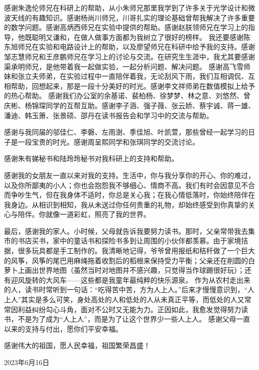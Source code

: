 \begin{acknowledgements}
感谢朱逸伦师兄在科研上的帮助，从小朱师兄那里我学到了许多关于光学设计和微波天线的有趣知识。感谢杨尚川师兄，川哥扎实的理论基础曾帮我解决了许多重要的数学问题。感谢高炳西师兄在实验中提供的帮助。感谢赵朕领师兄在学习上的指导，他既聪明又谦和，在做人做事方面都为我树立了很好的榜样。
我还要感谢陈东旭师兄在实验和电路设计上的帮助，以及廖望师兄在科研中给予我的支持。感谢邹志慧师兄和王彦鹏师兄在学习上的讨论与交流。在研究生生涯中，我尤其要感谢渠承明师兄，是他带着我一起做实验，一起分析问题、解决问题。
感谢高飞雪师妹和张立夫师弟，在实验过程中一直陪伴着我，无论刮风下雨，我们互相调侃、互相帮助，回想起来，那是一段十分美好的时光。感谢李文祥师弟在数值模拟上给予的热心帮助。
感谢我们办公室的余基诺、裴柏杨、徐梦梦、林之意、刘悠然、曾庆彬、杨锦琛同学的互帮互助。感谢李子涵、强子薇、张云娇、蔡宇诚、蒋一雄、潘迪、韩玉箫、张景硕、邵丹在读书报告会和学习中的交流与帮助。

感谢与我同届的邬佳仁、李磐、左雨澍、季佳旭、叶凯萱，那些曾经一起学习的日子是一段宝贵的时光。感谢周呈熙同学和张琪同学的交流讨论。

感谢朱有娣秘书和陆玲玲秘书对我科研上的支持和帮助。


感谢我的女朋友一直以来对我的支持。生活中，你与我分享你的开心、你的难过，以及你所鄙夷的小人；你也会抱怨我不够细心、情商不高。我们有时会因意见不合而争吵生气，但在我身体不适时，你总是关心我；在我心情低落时，你始终陪伴在我身边。从相识到相知，我从未送过你任何贵重的礼物，却始终感受到你真挚的关心与陪伴。你就像一道彩虹，照亮了我的世界。

最后，感谢我的家人。小时候，父母就告诉我要努力读书。那时，父亲常带我去集市的书店买书，家中的童话书和探险书多到让周围的小伙伴都羡慕。由于家境拮据，很多玩具都是手工制作的。我清晰地记得，爷爷曾用报纸和秸秆做了一个巨大的风筝，风筝的尾巴用麻绳拖着收割后的稻根来保持受力平衡；父亲还在削圆的白萝卜上画出世界地图（虽然当时对地图并不感兴趣，只觉得当作球踢很好玩）；还有迎风旋转的大风车——这些都是我童年最纯粹的快乐源泉。
作为从农村走出来的人，读书时常听到一句话：“吃得苦中苦，方为人上人。”后来才慢慢意识到，“人上人”其实是多么可笑，身处高处的人和低处的人从未真正平等，而低处的人又常常因利益纠纷勾心斗角，面对不公时又无能为力。正因如此，我愈发觉得努力读书，不是为了成为“人上人”，而是为了让这个世界少一些人上人。
感谢父母一直以来的支持与付出，愿你们平安幸福。

感谢伟大的祖国，愿人民幸福，祖国繁荣昌盛！

\hfill 2023年6月16日

\end{acknowledgements}

























